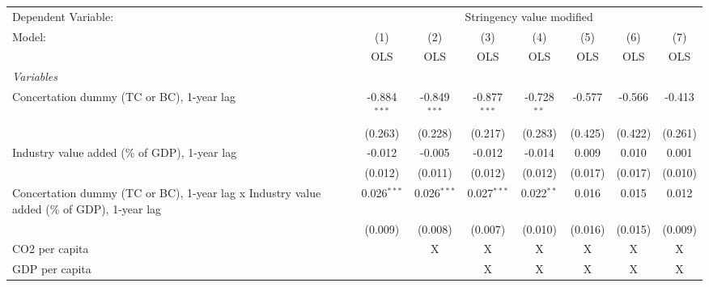 
\begingroup
\centering
\begin{tabular}{lccccccc}
   \toprule
   Dependent Variable: & \multicolumn{7}{c}{Stringency value modified}\\
   Model:                                                                                    & (1)            & (2)            & (3)            & (4)           & (5)     & (6)     & (7)\\  
                                                                                             &  OLS           & OLS            & OLS            & OLS           & OLS     & OLS     & OLS\\  
   \midrule
   \emph{Variables}\\
   Concertation dummy (TC or BC), 1-year lag                                                 & -0.884$^{***}$ & -0.849$^{***}$ & -0.877$^{***}$ & -0.728$^{**}$ & -0.577  & -0.566  & -0.413\\   
                                                                                             & (0.263)        & (0.228)        & (0.217)        & (0.283)       & (0.425) & (0.422) & (0.261)\\   
   Industry value added (\% of GDP), 1-year lag                                              & -0.012         & -0.005         & -0.012         & -0.014        & 0.009   & 0.010   & 0.001\\   
                                                                                             & (0.012)        & (0.011)        & (0.012)        & (0.012)       & (0.017) & (0.017) & (0.010)\\   
   Concertation dummy (TC or BC), 1-year lag x Industry value added (\% of GDP), 1-year lag  & 0.026$^{***}$  & 0.026$^{***}$  & 0.027$^{***}$  & 0.022$^{**}$  & 0.016   & 0.015   & 0.012\\   
                                                                                             & (0.009)        & (0.008)        & (0.007)        & (0.010)       & (0.016) & (0.015) & (0.009)\\   
   CO2 per capita                                                                            &                & X              & X              & X             & X       & X       & X\\  
   GDP per capita                                                                            &                &                & X              & X             & X       & X       & X\\  

\end{tabular}

